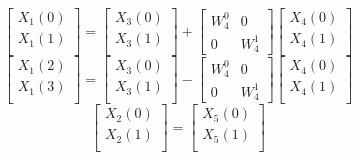 \documentclass[journal,12pt,twocolumn]{IEEEtran}
\renewcommand\thesection{\arabic{section}}
\begin{document}
\begin{enumerate}[label=\thesection.\arabic*]
\begin{enumerate}[label=\arabic*.,ref=\thesection.\theenumi]
\begin{equation}
       \begin{bmatrix}
         X_{1}(0) \\ 
         X_{1}(1)\\ 
       \end{bmatrix}
       =
       \begin{bmatrix}
         X_{3}(0) \\ 
         X_{3}(1)\\ 
       \end{bmatrix}
       +
       \begin{bmatrix}
         W^{0}_{4} & 0\\
         0 & W^{1}_{4}
       \end{bmatrix}
       \begin{bmatrix}
         X_{4}(0) \\ 
         X_{4}(1) \\ 
       \end{bmatrix}
     \end{equation}
     \begin{equation}
       \begin{bmatrix}
         X_{1}(2) \\ 
         X_{1}(3)\\ 
       \end{bmatrix}
       =
       \begin{bmatrix}
         X_{3}(0) \\ 
         X_{3}(1)\\ 
       \end{bmatrix}
       -
       \begin{bmatrix}
         W^{0}_{4} & 0\\
         0 & W^{1}_{4}
       \end{bmatrix}
       \begin{bmatrix}
         X_{4}(0) \\ 
         X_{4}(1) \\ 
       \end{bmatrix}
     \end{equation}
     \begin{equation}
       \begin{bmatrix}
         X_{2}(0) \\ 
         X_{2}(1)\\ 
       \end{bmatrix}
       =
       \begin{bmatrix}
         X_{5}(0) \\ 
         X_{5}(1)\\ 

\end{bmatrix}
\end{equation}
\end{enumerate}
\end{enumerate}
\end{document}
